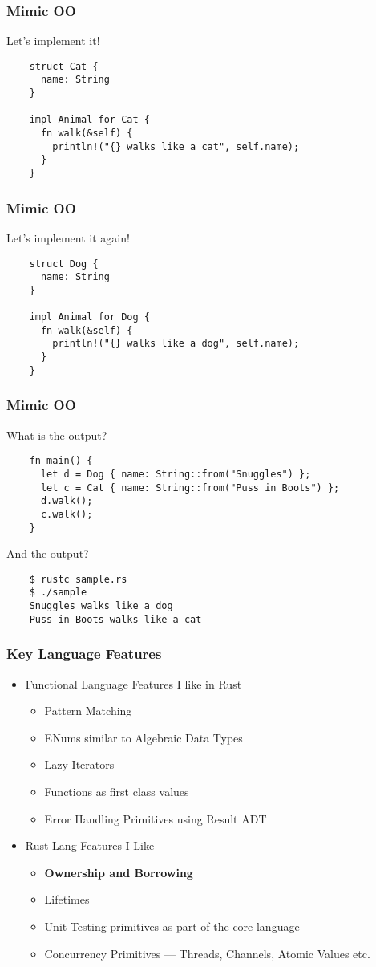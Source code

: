 \begin{frame}[fragile]
  \frametitle{Mimic OO}
  Let's implement it! \break{}
  \begin{verbatim}
    struct Cat {
      name: String
    }

    impl Animal for Cat {
      fn walk(&self) {
        println!("{} walks like a cat", self.name);
      }
    }
  \end{verbatim}
\end{frame}

\begin{frame}[fragile]
  \frametitle{Mimic OO}
  Let's implement it again! \break{}
  \begin{verbatim}
    struct Dog {
      name: String
    }

    impl Animal for Dog {
      fn walk(&self) {
        println!("{} walks like a dog", self.name);
      }
    }
  \end{verbatim}
\end{frame}

\begin{frame}[fragile]
  \frametitle{Mimic OO}
  What is the output? \break{}
  \begin{verbatim}
    fn main() {
      let d = Dog { name: String::from("Snuggles") };
      let c = Cat { name: String::from("Puss in Boots") };
      d.walk();
      c.walk();
    }
  \end{verbatim}
    \break{}
    And the output?
  \begin{verbatim}
    $ rustc sample.rs
    $ ./sample
    Snuggles walks like a dog
    Puss in Boots walks like a cat
  \end{verbatim}
\end{frame}

\begin{frame}
  \frametitle{Key Language Features}
  \begin{itemize}
  \item Functional Language Features I like in Rust
    \begin{itemize}
    \item Pattern Matching
    \item ENums similar to Algebraic Data Types
    \item Lazy Iterators
    \item Functions as first class values
    \item Error Handling Primitives using Result ADT
    \end{itemize}
  \item Rust Lang Features I Like
    \begin{itemize}
    \item \textbf{Ownership and Borrowing}
    \item Lifetimes
    \item Unit Testing primitives as part of the core language
    \item Concurrency Primitives --- Threads, Channels, Atomic Values etc.
    \end{itemize}
  \end{itemize}
\end{frame}
